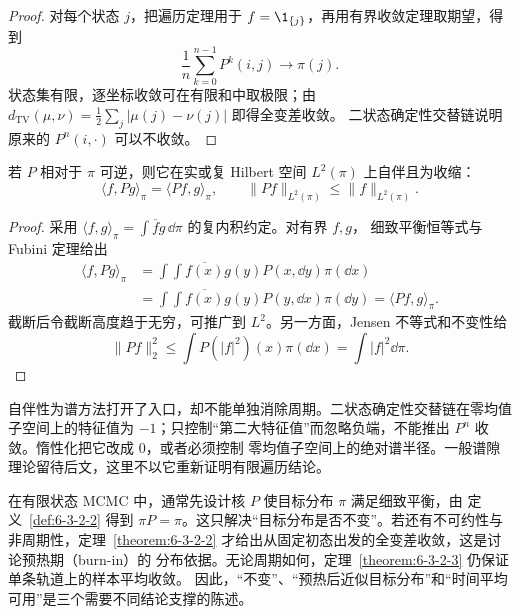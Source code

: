 \begin{proof}
对每个状态 $j$，把遍历定理用于 $f=\1_{\{j\}}$，再用有界收敛定理取期望，得到
\[
 \frac1n\sum_{k=0}^{n-1}P^k(i,j)\longrightarrow\pi(j).
\]
状态集有限，逐坐标收敛可在有限和中取极限；由
$d_{\mathrm{TV}}(\mu,\nu)=\tfrac12\sum_j|\mu(j)-\nu(j)|$ 即得全变差收敛。
二状态确定性交替链说明原来的 $P^n(i,\cdot)$ 可以不收敛。
\end{proof}

\begin{proposition}[可逆算子的 $L^2$ 结构]\label{proposition:6-3-2-4}
若 $P$ 相对于 $\pi$ 可逆，则它在实或复 Hilbert 空间 $L^2(\pi)$ 上自伴且为收缩：
\[
 \langle f,Pg\rangle_\pi=\langle Pf,g\rangle_\pi,
 \qquad \|Pf\|_{L^2(\pi)}\leq\|f\|_{L^2(\pi)}.
\]
\end{proposition}

\begin{proof}
采用 $\langle f,g\rangle_\pi=\int\overline f g\,\dd\pi$ 的复内积约定。对有界 $f,g$，
细致平衡恒等式与 Fubini 定理给出
\begin{align*}
 \langle f,Pg\rangle_\pi
 &=\int\!\int \overline{f(x)}g(y)P(x,\dd y)\pi(\dd x)\\
 &=\int\!\int \overline{f(x)}g(y)P(y,\dd x)\pi(\dd y)
 =\langle Pf,g\rangle_\pi.
\end{align*}
截断后令截断高度趋于无穷，可推广到 $L^2$。另一方面，Jensen 不等式和不变性给
\[
 \|Pf\|_2^2
 \leq\int P(|f|^2)(x)\pi(\dd x)
 =\int|f|^2\dd\pi.
\]
\end{proof}

自伴性为谱方法打开了入口，却不能单独消除周期。二状态确定性交替链在零均值子空间上的特征值为
$-1$；只控制“第二大特征值”而忽略负端，不能推出 $P^n$ 收敛。惰性化把它改成 $0$，或者必须控制
零均值子空间上的绝对谱半径。一般谱隙理论留待后文，这里不以它重新证明有限遍历结论。

\begin{remark}
在有限状态 MCMC 中，通常先设计核 $P$ 使目标分布 $\pi$ 满足细致平衡，由
定义~\ref{def:6-3-2-2} 得到 $\pi P=\pi$。这只解决“目标分布是否不变”。若还有不可约性与
非周期性，定理~\ref{theorem:6-3-2-2} 才给出从固定初态出发的全变差收敛，这是讨论预热期（burn-in）的
分布依据。无论周期如何，定理~\ref{theorem:6-3-2-3} 仍保证单条轨道上的样本平均收敛。
因此，“不变”、“预热后近似目标分布”和“时间平均可用”是三个需要不同结论支撑的陈述。
\end{remark}

